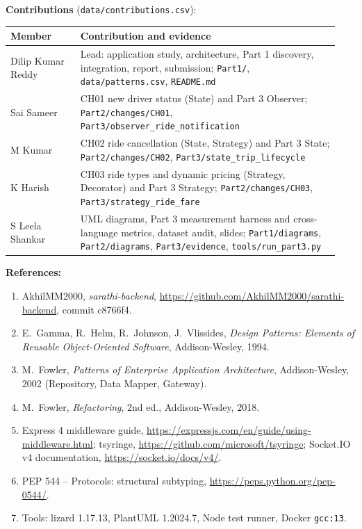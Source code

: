 \documentclass[11pt,a4paper]{article}
\begin{document}
\textbf{Contributions} (\texttt{data/contributions.csv}):\\
\begin{tabular}{@{}P{0.2\linewidth}P{0.74\linewidth}@{}}\toprule Member & Contribution and evidence\\\midrule
Dilip Kumar Reddy & Lead: application study, architecture, Part 1 discovery, integration, report, submission; \texttt{Part1/}, \texttt{data/patterns.csv}, \texttt{README.md}\\
Sai Sameer & CH01 new driver status (State) and Part 3 Observer; \texttt{Part2/changes/CH01}, \texttt{Part3/observer\_ride\_notification}\\
M Kumar & CH02 ride cancellation (State, Strategy) and Part 3 State; \texttt{Part2/changes/CH02}, \texttt{Part3/state\_trip\_lifecycle}\\
K Harish & CH03 ride types and dynamic pricing (Strategy, Decorator) and Part 3 Strategy; \texttt{Part2/changes/CH03}, \texttt{Part3/strategy\_ride\_fare}\\
S Leela Shankar & UML diagrams, Part 3 measurement harness and cross-language metrics, dataset audit, slides; \texttt{Part1/diagrams}, \texttt{Part2/diagrams}, \texttt{Part3/evidence}, \texttt{tools/run\_part3.py}\\
\bottomrule\end{tabular}

\textbf{References:}
\begin{enumerate}
\item AkhilMM2000, \emph{sarathi-backend}, \url{https://github.com/AkhilMM2000/sarathi-backend}, commit c8766f4.
\item E.~Gamma, R.~Helm, R.~Johnson, J.~Vlissides, \emph{Design Patterns: Elements of Reusable Object-Oriented Software}, Addison-Wesley, 1994.
\item M.~Fowler, \emph{Patterns of Enterprise Application Architecture}, Addison-Wesley, 2002 (Repository, Data Mapper, Gateway).
\item M.~Fowler, \emph{Refactoring}, 2nd ed., Addison-Wesley, 2018.
\item Express 4 middleware guide, \url{https://expressjs.com/en/guide/using-middleware.html}; tsyringe, \url{https://github.com/microsoft/tsyringe};
Socket.IO v4 documentation, \url{https://socket.io/docs/v4/}.
\item PEP 544 -- Protocols: structural subtyping, \url{https://peps.python.org/pep-0544/}.
\item Tools: lizard 1.17.13, PlantUML 1.2024.7, Node test runner, Docker \texttt{gcc:13}.
\end{enumerate}
\end{document}
